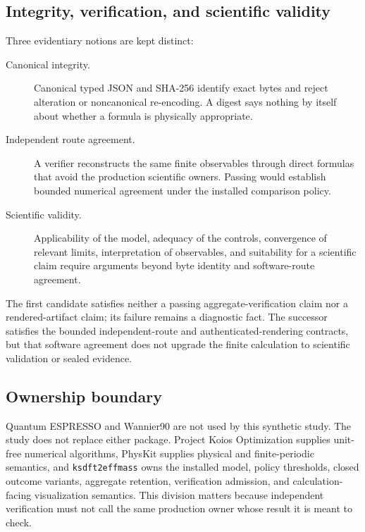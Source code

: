 \subsection{Integrity, verification, and scientific validity}

Three evidentiary notions are kept distinct:
\begin{description}
 \item[Canonical integrity.] Canonical typed JSON and SHA-256 identify exact bytes and
 reject alteration or noncanonical re-encoding.  A digest says nothing by itself about
 whether a formula is physically appropriate.
 \item[Independent route agreement.] A verifier reconstructs the same finite observables
 through direct formulas that avoid the production scientific owners.  Passing would
 establish bounded numerical agreement under the installed comparison policy.
 \item[Scientific validity.] Applicability of the model, adequacy of the controls,
 convergence of relevant limits, interpretation of observables, and suitability for a
 scientific claim require arguments beyond byte identity and software-route agreement.
\end{description}
The first candidate satisfies neither a passing aggregate-verification claim nor a
rendered-artifact claim; its failure remains a diagnostic fact.  The successor satisfies
the bounded independent-route and authenticated-rendering contracts, but that software
agreement does not upgrade the finite calculation to scientific validation or sealed
evidence.

\subsection{Ownership boundary}

Quantum ESPRESSO and Wannier90 are not used by this synthetic study.  The study does not
replace either package.  Project Koios Optimization supplies unit-free numerical
algorithms, PhysKit supplies physical and finite-periodic semantics, and
\texttt{ksdft2effmass} owns the installed model, policy thresholds, closed outcome
variants, aggregate retention, verification admission, and calculation-facing
visualization semantics.  This division matters because independent verification must
not call the same production owner whose result it is meant to check.
